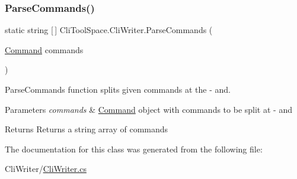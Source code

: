 \subsubsection{\texorpdfstring{ParseCommands()}{ParseCommands()}}
{\footnotesize\ttfamily static string \mbox{[}$\,$\mbox{]} Cli\+Tool\+Space.\+Cli\+Writer.\+Parse\+Commands (\begin{DoxyParamCaption}\item[{\mbox{\hyperlink{class_cli_tool_space_1_1_command}{Command}}}]{commands }\end{DoxyParamCaption})\hspace{0.3cm}{\ttfamily [static]}}



Parse\+Commands function splits given commands at the -\/ and. 


\begin{DoxyParams}{Parameters}
{\em commands} & \mbox{\hyperlink{class_cli_tool_space_1_1_command}{Command}} object with commands to be split at -\/ and\\
\hline
\end{DoxyParams}
\begin{DoxyReturn}{Returns}
Returns a string array of commands
\end{DoxyReturn}


The documentation for this class was generated from the following file\+:\begin{DoxyCompactItemize}
\item 
Cli\+Writer/\mbox{\hyperlink{_cli_writer_8cs}{Cli\+Writer.\+cs}}\end{DoxyCompactItemize}
